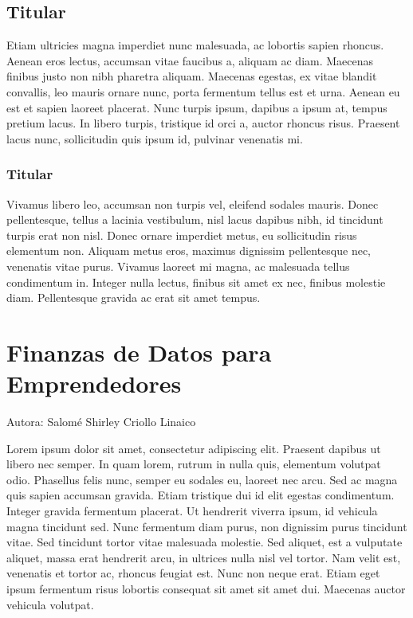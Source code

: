 \documentclass[
  letterpaper,
  DIV=11,
  numbers=noendperiod]{scrreprt}
\begin{document}
\hypertarget{titular-12}{%
\section{Titular}\label{titular-12}}

Etiam ultricies magna imperdiet nunc malesuada, ac lobortis sapien
rhoncus. Aenean eros lectus, accumsan vitae faucibus a, aliquam ac diam.
Maecenas finibus justo non nibh pharetra aliquam. Maecenas egestas, ex
vitae blandit convallis, leo mauris ornare nunc, porta fermentum tellus
est et urna. Aenean eu est et sapien laoreet placerat. Nunc turpis
ipsum, dapibus a ipsum at, tempus pretium lacus. In libero turpis,
tristique id orci a, auctor rhoncus risus. Praesent lacus nunc,
sollicitudin quis ipsum id, pulvinar venenatis mi.

\hypertarget{titular-13}{%
\subsection{Titular}\label{titular-13}}

Vivamus libero leo, accumsan non turpis vel, eleifend sodales mauris.
Donec pellentesque, tellus a lacinia vestibulum, nisl lacus dapibus
nibh, id tincidunt turpis erat non nisl. Donec ornare imperdiet metus,
eu sollicitudin risus elementum non. Aliquam metus eros, maximus
dignissim pellentesque nec, venenatis vitae purus. Vivamus laoreet mi
magna, ac malesuada tellus condimentum in. Integer nulla lectus, finibus
sit amet ex nec, finibus molestie diam. Pellentesque gravida ac erat sit
amet tempus.


\hypertarget{finanzas-de-datos-para-emprendedores}{%
\chapter{Finanzas de Datos para
Emprendedores}\label{finanzas-de-datos-para-emprendedores}}

Autora: Salomé Shirley Criollo Linaico

Lorem ipsum dolor sit amet, consectetur adipiscing elit. Praesent
dapibus ut libero nec semper. In quam lorem, rutrum in nulla quis,
elementum volutpat odio. Phasellus felis nunc, semper eu sodales eu,
laoreet nec arcu. Sed ac magna quis sapien accumsan gravida. Etiam
tristique dui id elit egestas condimentum. Integer gravida fermentum
placerat. Ut hendrerit viverra ipsum, id vehicula magna tincidunt sed.
Nunc fermentum diam purus, non dignissim purus tincidunt vitae. Sed
tincidunt tortor vitae malesuada molestie. Sed aliquet, est a vulputate
aliquet, massa erat hendrerit arcu, in ultrices nulla nisl vel tortor.
Nam velit est, venenatis et tortor ac, rhoncus feugiat est. Nunc non
neque erat. Etiam eget ipsum fermentum risus lobortis consequat sit amet
sit amet dui. Maecenas auctor vehicula volutpat.
\end{document}
